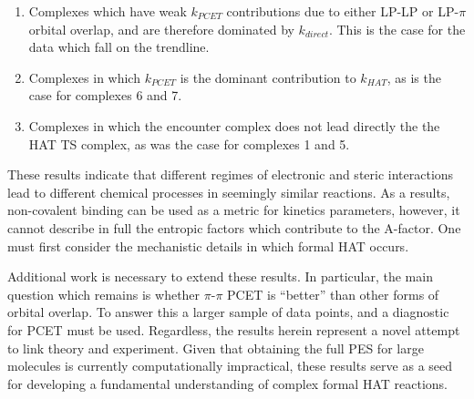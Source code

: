 \begin{enumerate}
  \item Complexes which have weak $k_{PCET}$ contributions due to either LP-LP or LP-$\pi$ orbital overlap, and are therefore dominated by $k_{direct}$. This is the case for the data which fall on the trendline.

  \item Complexes in which $k_{PCET}$ is the dominant contribution to $k_{HAT}$, as is the case for complexes 6 and 7.

  \item Complexes in which the encounter complex does not lead directly the the HAT TS complex, as was the case for complexes 1 and 5.
\end{enumerate}

These results indicate that different regimes of electronic and steric interactions lead to different chemical processes in seemingly similar reactions. As a results, non-covalent binding can be used as a metric for kinetics parameters, however, it cannot describe in full the entropic factors which contribute to the A-factor. One must first consider the mechanistic details in which formal HAT occurs.

Additional work is necessary to extend these results. In particular, the main question which remains is whether $\pi$-$\pi$ PCET is ``better'' than other forms of orbital overlap. To answer this a larger sample of data points, and a diagnostic for PCET must be used. Regardless, the results herein represent a novel attempt to link theory and experiment. Given that obtaining the full PES for large molecules is currently computationally impractical, these results serve as a seed for developing a fundamental understanding of complex formal HAT reactions.
